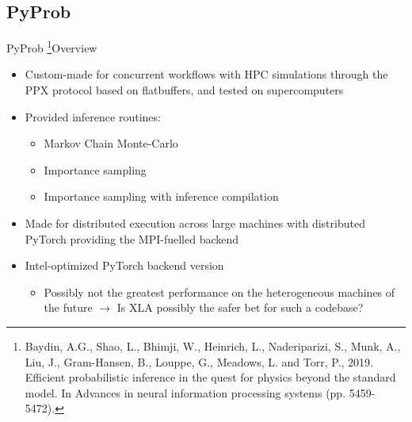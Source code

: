 \documentclass[AERbeamer%
              ,optEnglish%
              ,optBiber%
              ,optBibstyleAlphabetic%
              ,optBeamerClassicFormat%
              ]{AERlatex}%
\begin{document}
\subsection{PyProb}
\begin{frame}[c]{PyProb \footnote{Baydin, A.G., Shao, L., Bhimji, W., Heinrich, L., Naderiparizi, S., Munk, A., Liu, J., Gram-Hansen, B.,
                                  Louppe, G., Meadows, L. and Torr, P., 2019. Efficient probabilistic inference in the quest for physics
                                  beyond the standard model. In Advances in neural information processing systems (pp. 5459-5472).}}{Overview}
    \centering
    \begin{itemize}
        \item Custom-made for concurrent workflows with HPC simulations through the PPX protocol based on flatbuffers, and tested on supercomputers
        \item Provided inference routines:
        \begin{itemize}
            \item Markov Chain Monte-Carlo
            \item Importance sampling
            \item Importance sampling with inference compilation
        \end{itemize}
        \item Made for distributed execution across large machines with distributed PyTorch providing the MPI-fuelled backend
        \item Intel-optimized PyTorch backend version
        \begin{itemize}
            \item Possibly not the greatest performance on the heterogeneous machines of the future $\longrightarrow$ Is XLA possibly the safer bet for
                  such a codebase?
        \end{itemize}
    \end{itemize}
\end{frame}
\end{document}
